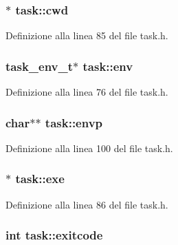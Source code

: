 \hypertarget{structtask_a7099e7ba6a4c94559edfb4d396803b15}{
\subsubsection[{cwd}]{$\ast$ task\+::cwd}}\label{structtask_a7099e7ba6a4c94559edfb4d396803b15}


Definizione alla linea 85 del file task.\+h.

\hypertarget{structtask_a8dbbb79f7c29771d36f1d98ec84cbbdf}{
\subsubsection[{env}]{\setlength{\rightskip}{0pt plus 5cm}task\+\_\+env\+\_\+t$\ast$ task\+::env}}\label{structtask_a8dbbb79f7c29771d36f1d98ec84cbbdf}


Definizione alla linea 76 del file task.\+h.

\hypertarget{structtask_a09fbc78d666a0b49e2e2064121d28364}{
\subsubsection[{envp}]{\setlength{\rightskip}{0pt plus 5cm}char$\ast$$\ast$ task\+::envp}}\label{structtask_a09fbc78d666a0b49e2e2064121d28364}


Definizione alla linea 100 del file task.\+h.

\hypertarget{structtask_a22a59fcfc18d5f671340669f96571768}{
\subsubsection[{exe}]{$\ast$ task\+::exe}}\label{structtask_a22a59fcfc18d5f671340669f96571768}


Definizione alla linea 86 del file task.\+h.

\hypertarget{structtask_a9bd7bbd83fe1f4744c76ff240b6da5db}{
\subsubsection[{exitcode}]{\setlength{\rightskip}{0pt plus 5cm}int task\+::exitcode}}\label{structtask_a9bd7bbd83fe1f4744c76ff240b6da5db}


